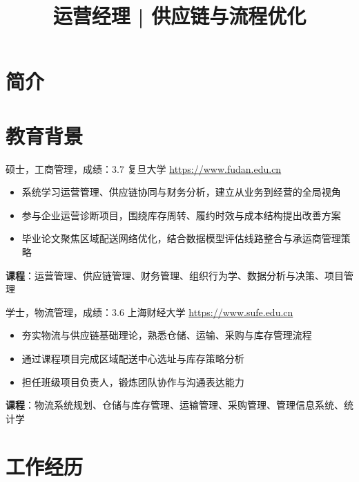 \documentclass[a4paper, serif, 10pt]{moderncv}
\title{运营经理 | 供应链与流程优化}
\begin{document}
\maketitle

\section{简介}

\section{教育背景}

        {硕士，工商管理，成绩：3.7}
        {复旦大学}
        {\url{https://www.fudan.edu.cn}}
        {}
        {\begin{itemize}
\item 系统学习运营管理、供应链协同与财务分析，建立从业务到经营的全局视角
\item 参与企业运营诊断项目，围绕库存周转、履约时效与成本结构提出改善方案
\item 毕业论文聚焦区域配送网络优化，结合数据模型评估线路整合与承运商管理策略
\end{itemize}
\textbf{课程}：运营管理、供应链管理、财务管理、组织行为学、数据分析与决策、项目管理}

        {学士，物流管理，成绩：3.6}
        {上海财经大学}
        {\url{https://www.sufe.edu.cn}}
        {}
        {\begin{itemize}
\item 夯实物流与供应链基础理论，熟悉仓储、运输、采购与库存管理流程
\item 通过课程项目完成区域配送中心选址与库存策略分析
\item 担任班级项目负责人，锻炼团队协作与沟通表达能力
\end{itemize}
\textbf{课程}：物流系统规划、仓储与库存管理、运输管理、采购管理、管理信息系统、统计学}
\section{工作经历}
\end{document}
